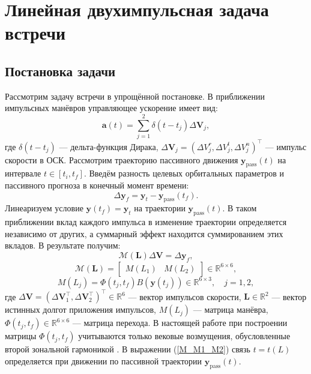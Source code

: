 \section{Линейная двухимпульсная задача встречи}


\subsection{Постановка задачи}

Рассмотрим задачу встречи в упрощённой постановке. В приближении импульсных манёвров управляющее ускорение имеет вид:
\begin{equation}
    \mathbf{a}(t) = \sum_{j=1}^2 \delta(t - t_j) \Delta \mathbf{V}_j,
\label{a_t_2_imp}
\end{equation}
где $\delta(t - t_j)$ --- дельта-функция Дирака, $\Delta \mathbf{V}_j = \left( \Delta V_j^r, \Delta V_j^t, \Delta V_j^n \right)^\top$ --- импульс скорости в ОСК. Рассмотрим траекторию пассивного движения $\mathbf{y}_{\text{pass}}(t)$ на интервале $t \in [t_i, t_f]$. Введём разность целевых орбитальных параметров и пассивного прогноза в конечный момент времени: 
\begin{equation*}
    \Delta \mathbf{y}_f = \mathbf{y}_t - \mathbf{y}_{\text{pass}}(t_f).
\end{equation*}
Линеаризуем условие $\mathbf{y}(t_f) = \mathbf{y}_t$ на траектории $\mathbf{y}_{\text{pass}}(t)$. В таком приближении вклад каждого импульса в изменение траектории определяется независимо от других, а суммарный эффект находится суммированием этих вкладов. В результате получим:
\begin{equation}
    \mathcal{M}(\mathbf{L}) \Delta \mathbf{V} = \Delta \mathbf{y}_f,
\label{constraint_lin_2_imp}
\end{equation}
\begin{equation}
\mathcal{M}(\mathbf{L}) = 
\begin{bmatrix}
    M(L_1) & M(L_2)
\end{bmatrix} \in \mathbb{R}^{6 \times 6},
\label{M_M1_M2}
\end{equation}
\begin{equation}
    M(L_j) = \Phi(t_j, t_f) B(\mathbf{y}(t_j)) \in \mathbb{R}^{6 \times 3}, \quad 
    j = 1, 2,
\label{M_j}
\end{equation}
где $\Delta \mathbf{V} = \left( \Delta \mathbf{V}_1^\top, \Delta \mathbf{V}_2^\top \right)^\top \in \mathbb{R}^{6}$ --- вектор импульсов скорости, $\mathbf{L} \in \mathbb{R}^{2}$ --- вектор истинных долгот приложения импульсов, $M(L_j)$ --- матрица манёвра, $\Phi(t_j, t_f) \in \mathbb{R}^{6 \times 6}$ --- матрица перехода. В настоящей работе при построении матрицы $\Phi(t_j, t_f)$ учитываются только вековые возмущения, обусловленные второй зональной гармоникой \cite{батраков1981формулы}. В выражении (\ref{M_M1_M2}) связь $t = t(L)$ определяется при движении по пассивной траектории $\mathbf{y}_{\text{pass}}(t)$.

